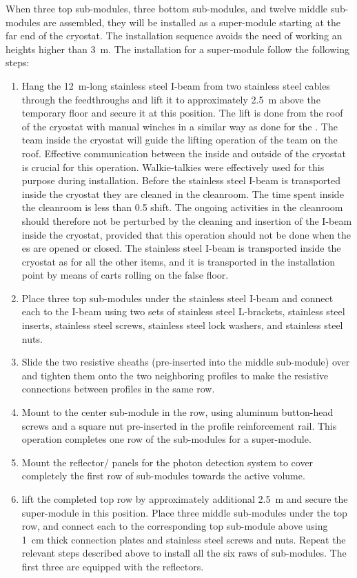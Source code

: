 When three top sub-modules, three bottom sub-modules, and twelve middle sub-modules are assembled, they will be installed as a super-module starting at the far end of the cryostat.
The installation sequence avoids the need of working an heights higher than 3~m.
The installation for a super-module follow the following steps:
\begin{enumerate}
\item Hang the 12~m-long stainless steel I-beam from two stainless steel cables through the feedthroughs and lift it to approximately 2.5~m above the temporary floor and secure it at this position.
The lift is done from the roof of the cryostat with manual winches in a similar way as done for the .
The team inside the cryostat will guide the lifting operation of the team on the roof.
Effective communication between the inside and outside of the cryostat is crucial for this operation.
Walkie-talkies were effectively used for this purpose during  installation.
Before the stainless steel I-beam is transported inside the cryostat they are cleaned in the cleanroom.
The time spent inside the cleanroom is less than 0.5 shift.
The ongoing activities in the cleanroom should therefore not be perturbed by the cleaning and insertion of the I-beam inside the cryostat, provided that this operation should not be done when the  \coldbox{}es are opened or closed.
The stainless steel I-beam is transported inside the cryostat as for all the other items, and it is transported in the installation point by means of carts rolling on the false floor.
\item Place three top sub-modules under the stainless steel I-beam and connect each to the I-beam using two sets of stainless steel L-brackets, stainless steel inserts, stainless steel screws, stainless steel lock washers, and stainless steel nuts.
\item Slide the two resistive sheaths (pre-inserted into the middle sub-module) over and tighten them onto the two neighboring profiles to make the resistive connections between profiles in the same row.
\item Mount  to the center sub-module in the row, using aluminum button-head screws and a square nut pre-inserted in the profile reinforcement rail.
This operation completes one row of the sub-modules for a super-module.
\item Mount the reflector/ panels for the photon detection system to cover completely the first row of sub-modules towards the active volume.
\item lift the completed top row by approximately additional 2.5~m and secure the super-module in this position.
Place three middle sub-modules under the top row, and connect each to the corresponding top sub-module above using 1~cm thick connection plates and stainless steel screws and nuts.
Repeat the relevant steps described above to install all the six raws of sub-modules.
The first three are equipped with the reflectors.
\end{enumerate}

